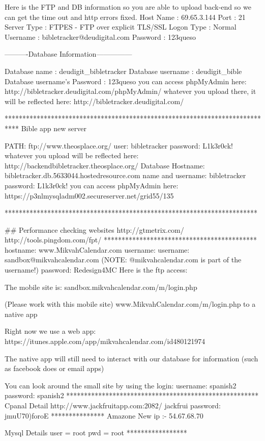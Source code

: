 Here is the FTP and DB information so you are able to upload back-end so we can get the time out and http errors fixed.
Host Name : 69.65.3.144
Port : 21
Server Type : FTPES - FTP over explicit TLS/SSL
Logon Type : Normal
Username : bibletracker@deudigital.com
Password : 123queso

———-Database Information—————

Database name : deudigit_bibletracker
Database username : deudigit_bible
Database username’s Password : 123queso
you can access phpMyAdmin here: http://bibletracker.deudigital.com/phpMyAdmin/
whatever you upload there, it will be reflected here: http://bibletracker.deudigital.com/

****************************************************************************
Bible app new server

PATH: ftp://www.theosplace.org/
user: bibletracker
password: L1k3r0ck!
whatever you upload will be reflected here: http://backendbibletracker.theosplace.org/
Database
Hostname: bibletracker.db.5633044.hostedresource.com
name and username: bibletracker
password: L1k3r0ck!
you can access phpMyAdmin here: https://p3nlmysqladm002.secureserver.net/grid55/135	



***********************************************************************

## Performance checking websites
http://gtmetrix.com/
http://tools.pingdom.com/fpt/
*******************************************
hostname: www.MikvahCalendar.com
username: username:  sandbox@mikvahcalendar.com   (NOTE: @mikvahcalendar.com is part of the username!)
password: Redesign4MC Here is the ftp access:

The mobile site is:
sandbox.mikvahcalendar.com/m/login.php

(Please work with this mobile site)
www.MikvahCalendar.com/m/login.php
to a native app

Right now we use a web app: https://itunes.apple.com/app/mikvahcalendar.com/id480121974

The native app will still need to interact with our database for information (such as facebook does or email apps)

You can look around the small site by using the login:
username: spanish2
password: spanish2 
******************************************************
Cpanal Detail
http://www.jackfruitapp.com:2082/
jackfrui
password: jmuU70)foroE
***************
Amazone
New ip :- 54.67.68.70

Mysql Details
user = root
pwd = root
*****************


